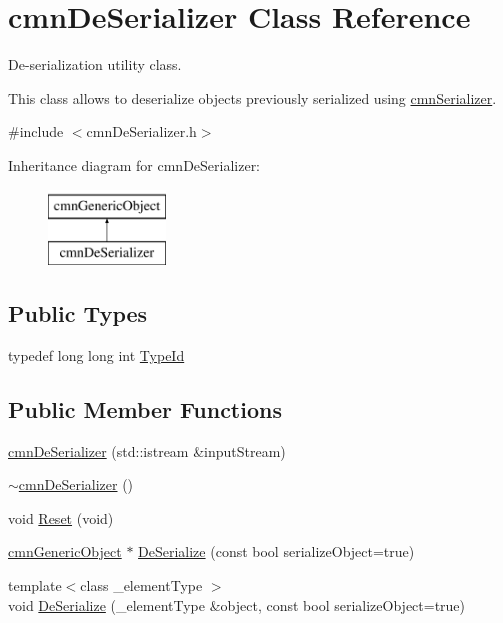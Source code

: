 \hypertarget{classcmn_de_serializer}{\section{cmn\-De\-Serializer Class Reference}
\label{classcmn_de_serializer}
}


De-\/serialization utility class.

This class allows to deserialize objects previously serialized using \hyperlink{classcmn_serializer}{cmn\-Serializer}.  




{\ttfamily \#include $<$cmn\-De\-Serializer.\-h$>$}

Inheritance diagram for cmn\-De\-Serializer\-:\begin{figure}[H]
\begin{center}
\leavevmode
\includegraphics[height=2.000000cm]{d5/ddd/classcmn_de_serializer}
\end{center}
\end{figure}
\subsection*{Public Types}
\begin{DoxyCompactItemize}
\item 
typedef long long int \hyperlink{classcmn_de_serializer_aa4c89a09461da0a62a6cc4a29dfdd3c2}{Type\-Id}
\end{DoxyCompactItemize}
\subsection*{Public Member Functions}
\begin{DoxyCompactItemize}
\item 
\hyperlink{classcmn_de_serializer_adf60bd67f459b34a40ee529f4070a274}{cmn\-De\-Serializer} (std\-::istream \&input\-Stream)
\item 
\hyperlink{classcmn_de_serializer_aa4685fa9d34c83c5f2e9e115396b956f}{$\sim$cmn\-De\-Serializer} ()
\item 
void \hyperlink{classcmn_de_serializer_a601562de150fb39655137e1e7a12c1d1}{Reset} (void)
\item 
\hyperlink{classcmn_generic_object}{cmn\-Generic\-Object} $\ast$ \hyperlink{classcmn_de_serializer_a97972734ea443add8c55f1874c343bee}{De\-Serialize} (const bool serialize\-Object=true)
\item 
{\footnotesize template$<$class \-\_\-element\-Type $>$ }\\void \hyperlink{classcmn_de_serializer_a4be6c703211fbe1c6b9e890d733d7fa7}{De\-Serialize} (\-\_\-element\-Type \&object, const bool serialize\-Object=true)
\end{DoxyCompactItemize}


